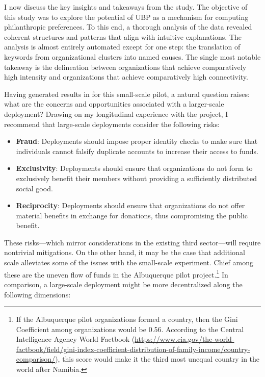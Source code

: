 I now discuss the key insights and takeaways from the study.
The objective of this study was to explore the potential of UBP as a mechanism for computing philanthropic preferences.
To this end, a thorough analysis of the data revealed coherent structures and patterns that align with intuitive explanations.
The analysis is almost entirely automated except for one step: the translation of keywords from organizational clusters into named causes.
The single most notable takeaway is the delineation between organizations that achieve comparatively high intensity and organizations that achieve comparatively high connectivity.

Having generated results in for this small-scale pilot, a natural question raises: what are the concerns and opportunities associated with a larger-scale deployment?
Drawing on my longitudinal experience with the project, I recommend that large-scale deployments consider the following risks:

\begin{itemize}
  \item \textbf{Fraud}: Deployments should impose proper identity checks to make sure that individuals cannot falsify duplicate accounts to increase their access to funds.
  \item \textbf{Exclusivity}: Deployments should ensure that organizations do not form to exclusively benefit their members without providing a sufficiently distributed social good.
  \item \textbf{Reciprocity}: Deployments should ensure that organizations do not offer material benefits in exchange for donations, thus compromising the public benefit.
\end{itemize}

These risks---which mirror considerations in the existing third sector---will require nontrivial mitigations.
On the other hand, it may be the case that additional scale alleviates some of the issues with the small-scale experiment.
Chief among these are the uneven flow of funds in the Albuquerque pilot project.\footnote{If the Albuquerque pilot organizations formed a country, then the Gini Coefficient among organizations would be 0.56. According to the Central Intelligence Agency World Factbook (\url{https://www.cia.gov/the-world-factbook/field/gini-index-coefficient-distribution-of-family-income/country-comparison/}), this score would make it the third most unequal country in the world after Namibia.}
In comparison, a large-scale deployment might be more decentralized along the following dimensions:

